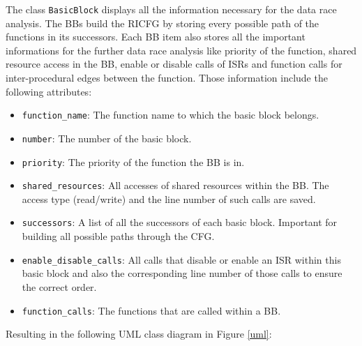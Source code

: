 \documentclass[
fancyheadings, %
%
%
]{stsreprt}
\begin{document}
{The class \texttt{BasicBlock} displays all the information necessary for the data race analysis. The \aclp{BB} build the \ac{RICFG} by storing every possible path of the functions in its successors. Each \ac{BB} item also stores all the important informations for the further data race analysis like priority of the function, shared resource access in the \ac{BB}, enable or disable calls of \acp{ISR} and function calls for inter-procedural edges between the function. Those information include the following attributes:
\begin{itemize}
	\item \texttt{function\_name}: The function name to which the basic block belongs.
	\item \texttt{number}: The number of the basic block.
	\item \texttt{priority}: The priority of the function the \ac{BB} is in.
	\item \texttt{shared\_resources}: All accesses of shared resources within the \ac{BB}. The access type (read/write) and the line number of such calls are saved.
	\item \texttt{successors}: A list of all the successors of each basic block. Important for building all possible paths through the CFG.
	\item \texttt{enable\_disable\_calls}: All calls that disable or enable an \ac{ISR} within this basic block and also the corresponding line number of those calls to ensure the correct order.
	\item \texttt{function\_calls}: The functions that are called within a \ac{BB}.
\end{itemize}
Resulting in the following UML class diagram in Figure \ref{uml}:
\begin{figure}[H]
	\centering
\end{figure}}
\end{document}
